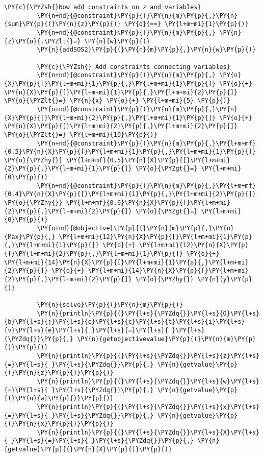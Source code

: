 \begin{codeCell}
\begin{Verbatim}[commandchars=\\\{\}]
         \PY{c}{\PYZsh{}Now add constraints on z and variables}
         \PY{n+nd}{@constraint}\PY{p}{(}\PY{n}{m}\PY{p}{,}\PY{n}{sum}\PY{p}{(}\PY{n}{z}\PY{p}{)} \PY{o}{==} \PY{l+m+mi}{1}\PY{p}{)}
         \PY{n+nd}{@constraint}\PY{p}{(}\PY{n}{m}\PY{p}{,} \PY{n}{z}\PY{o}{.\PYZlt{}=} \PY{n}{w}\PY{p}{)}
         \PY{n}{addSOS2}\PY{p}{(}\PY{n}{m}\PY{p}{,}\PY{n}{w}\PY{p}{)}
         
         \PY{c}{\PYZsh{} Add constraints connecting variables}
         \PY{n+nd}{@constraint}\PY{p}{(}\PY{n}{m}\PY{p}{,} \PY{n}{X}\PY{p}{[}\PY{l+m+mi}{1}\PY{p}{,}\PY{l+m+mi}{1}\PY{p}{]} \PY{o}{+} \PY{n}{X}\PY{p}{[}\PY{l+m+mi}{1}\PY{p}{,}\PY{l+m+mi}{2}\PY{p}{]} \PY{o}{\PYZlt{}=} \PY{n}{x} \PY{o}{+} \PY{l+m+mi}{5} \PY{p}{)}
         \PY{n+nd}{@constraint}\PY{p}{(}\PY{n}{m}\PY{p}{,}\PY{n}{X}\PY{p}{[}\PY{l+m+mi}{2}\PY{p}{,}\PY{l+m+mi}{1}\PY{p}{]} \PY{o}{+} \PY{n}{X}\PY{p}{[}\PY{l+m+mi}{2}\PY{p}{,}\PY{l+m+mi}{2}\PY{p}{]} \PY{o}{\PYZlt{}=} \PY{l+m+mi}{10}\PY{p}{)}
         \PY{n+nd}{@constraint}\PY{p}{(}\PY{n}{m}\PY{p}{,}\PY{l+m+mf}{0.5}\PY{n}{X}\PY{p}{[}\PY{l+m+mi}{1}\PY{p}{,}\PY{l+m+mi}{1}\PY{p}{]} \PY{o}{\PYZhy{}} \PY{l+m+mf}{0.5}\PY{n}{X}\PY{p}{[}\PY{l+m+mi}{2}\PY{p}{,}\PY{l+m+mi}{1}\PY{p}{]} \PY{o}{\PYZgt{}=} \PY{l+m+mi}{0}\PY{p}{)}
         \PY{n+nd}{@constraint}\PY{p}{(}\PY{n}{m}\PY{p}{,}\PY{l+m+mf}{0.4}\PY{n}{X}\PY{p}{[}\PY{l+m+mi}{1}\PY{p}{,}\PY{l+m+mi}{2}\PY{p}{]} \PY{o}{\PYZhy{}} \PY{l+m+mf}{0.6}\PY{n}{X}\PY{p}{[}\PY{l+m+mi}{2}\PY{p}{,}\PY{l+m+mi}{2}\PY{p}{]} \PY{o}{\PYZgt{}=} \PY{l+m+mi}{0}\PY{p}{)}
         \PY{n+nd}{@objective}\PY{p}{(}\PY{n}{m}\PY{p}{,}\PY{n}{Max}\PY{p}{,} \PY{l+m+mi}{12}\PY{n}{X}\PY{p}{[}\PY{l+m+mi}{1}\PY{p}{,}\PY{l+m+mi}{1}\PY{p}{]} \PY{o}{+} \PY{l+m+mi}{12}\PY{n}{X}\PY{p}{[}\PY{l+m+mi}{2}\PY{p}{,}\PY{l+m+mi}{1}\PY{p}{]} \PY{o}{+} \PY{l+m+mi}{14}\PY{n}{X}\PY{p}{[}\PY{l+m+mi}{1}\PY{p}{,}\PY{l+m+mi}{2}\PY{p}{]} \PY{o}{+} \PY{l+m+mi}{14}\PY{n}{X}\PY{p}{[}\PY{l+m+mi}{2}\PY{p}{,}\PY{l+m+mi}{2}\PY{p}{]} \PY{o}{\PYZhy{}} \PY{n}{y}\PY{p}{)}
         
         \PY{n}{solve}\PY{p}{(}\PY{n}{m}\PY{p}{)}
         \PY{n}{println}\PY{p}{(}\PY{l+s}{\PYZdq{}}\PY{l+s}{O}\PY{l+s}{b}\PY{l+s}{j}\PY{l+s}{e}\PY{l+s}{c}\PY{l+s}{t}\PY{l+s}{i}\PY{l+s}{v}\PY{l+s}{e}\PY{l+s}{ }\PY{l+s}{=}\PY{l+s}{ }\PY{l+s}{\PYZdq{}}\PY{p}{,} \PY{n}{getobjectivevalue}\PY{p}{(}\PY{n}{m}\PY{p}{)}\PY{p}{)}
         \PY{n}{println}\PY{p}{(}\PY{l+s}{\PYZdq{}}\PY{l+s}{z}\PY{l+s}{=}\PY{l+s}{ }\PY{l+s}{\PYZdq{}}\PY{p}{,} \PY{n}{getvalue}\PY{p}{(}\PY{n}{z}\PY{p}{)}\PY{p}{)}
         \PY{n}{println}\PY{p}{(}\PY{l+s}{\PYZdq{}}\PY{l+s}{w}\PY{l+s}{=}\PY{l+s}{ }\PY{l+s}{\PYZdq{}}\PY{p}{,} \PY{n}{getvalue}\PY{p}{(}\PY{n}{w}\PY{p}{)}\PY{p}{)}
         \PY{n}{println}\PY{p}{(}\PY{l+s}{\PYZdq{}}\PY{l+s}{x}\PY{l+s}{=}\PY{l+s}{ }\PY{l+s}{\PYZdq{}}\PY{p}{,} \PY{n}{getvalue}\PY{p}{(}\PY{n}{x}\PY{p}{)}\PY{p}{)}
         \PY{n}{println}\PY{p}{(}\PY{l+s}{\PYZdq{}}\PY{l+s}{X}\PY{l+s}{ }\PY{l+s}{=}\PY{l+s}{ }\PY{l+s}{\PYZdq{}}\PY{p}{,} \PY{n}{getvalue}\PY{p}{(}\PY{n}{X}\PY{p}{)}\PY{p}{)}
\end{Verbatim}


\end{codeCell}
